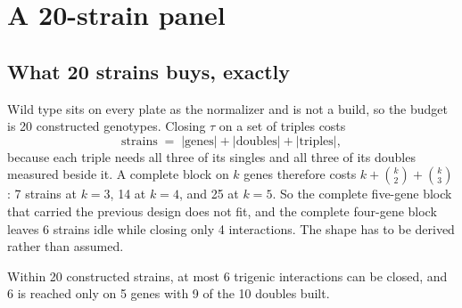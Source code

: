 
\section{A 20-strain panel}\label{sec:panel20}

\subsection{What 20 strains buys, exactly}

Wild type sits on every plate as the normalizer and is not a build, so the budget
is 20 constructed genotypes. Closing $\tau$ on a set of triples costs
\[
  \text{strains} \;=\; |\text{genes}| + |\text{doubles}| + |\text{triples}|,
\]
because each triple needs all three of its singles and all three of its doubles
measured beside it. A complete block on $k$ genes therefore costs
$k + \binom{k}{2} + \binom{k}{3}$: 7 strains at $k = 3$, 14 at $k = 4$, and 25 at
$k = 5$. So the complete five-gene block that carried the previous design does not
fit, and the complete four-gene block leaves 6 strains idle while closing only 4
interactions. The shape has to be derived rather than assumed.

\begin{proposition}
Within 20 constructed strains, at most 6 trigenic interactions can be closed, and
6 is reached only on 5 genes with 9 of the 10 doubles built.
\end{proposition}

